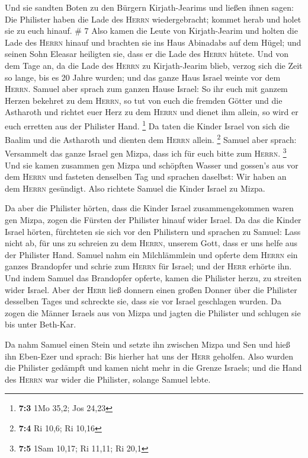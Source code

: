  Und sie sandten Boten zu den Bürgern Kirjath-Jearims und
ließen ihnen sagen: Die Philister haben die Lade des \textsc{Herrn}
wiedergebracht; kommet herab und holet sie zu euch hinauf. \# 7
 Also kamen die Leute von Kirjath-Jearim und holten die
Lade des \textsc{Herrn} hinauf und brachten sie ins Haus Abinadabs auf
dem Hügel; und seinen Sohn Eleasar heiligten sie, dass er die Lade des
\textsc{Herrn} hütete.  Und von dem Tage an, da die Lade
des \textsc{Herrn} zu Kirjath-Jearim blieb, verzog sich die Zeit so
lange, bis es 20 Jahre wurden; und das ganze Haus Israel weinte vor dem
\textsc{Herrn}.  Samuel aber sprach zum ganzen Hause
Israel: So ihr euch mit ganzem Herzen bekehret zu dem \textsc{Herrn}, so
tut von euch die fremden Götter und die Astharoth und richtet euer Herz
zu dem \textsc{Herrn} und dienet ihm allein, so wird er euch erretten
aus der Philister Hand. \footnote{\textbf{7:3} 1Mo 35,2; Jos 24,23}
 Da taten die Kinder Israel von sich die Baalim und die
Astharoth und dienten dem \textsc{Herrn} allein. \footnote{\textbf{7:4}
  Ri 10,6; Ri 10,16}  Samuel aber sprach: Versammelt das
ganze Israel gen Mizpa, dass ich für euch bitte zum \textsc{Herrn}.
\footnote{\textbf{7:5} 1Sam 10,17; Ri 11,11; Ri 20,1}  Und
sie kamen zusammen gen Mizpa und schöpften Wasser und gossen's aus vor
dem \textsc{Herrn} und fasteten denselben Tag und sprachen daselbst: Wir
haben an dem \textsc{Herrn} gesündigt. Also richtete Samuel die Kinder
Israel zu Mizpa.

 Da aber die Philister hörten, dass die Kinder Israel
zusammengekommen waren gen Mizpa, zogen die Fürsten der Philister hinauf
wider Israel. Da das die Kinder Israel hörten, fürchteten sie sich vor
den Philistern  und sprachen zu Samuel: Lass nicht ab, für
uns zu schreien zu dem \textsc{Herrn}, unserem Gott, dass er uns helfe
aus der Philister Hand.  Samuel nahm ein Milchlämmlein und
opferte dem \textsc{Herrn} ein ganzes Brandopfer und schrie zum
\textsc{Herrn} für Israel; und der \textsc{Herr} erhörte ihn.
 Und indem Samuel das Brandopfer opferte, kamen die
Philister herzu, zu streiten wider Israel. Aber der \textsc{Herr} ließ
donnern einen großen Donner über die Philister desselben Tages und
schreckte sie, dass sie vor Israel geschlagen wurden.  Da
zogen die Männer Israels aus von Mizpa und jagten die Philister und
schlugen sie bis unter Beth-Kar.

 Da nahm Samuel einen Stein und setzte ihn zwischen Mizpa
und Sen und hieß ihn Eben-Ezer und sprach: Bis hierher hat uns der
\textsc{Herr} geholfen.  Also wurden die Philister
gedämpft und kamen nicht mehr in die Grenze Israels; und die Hand des
\textsc{Herrn} war wider die Philister, solange Samuel lebte.

